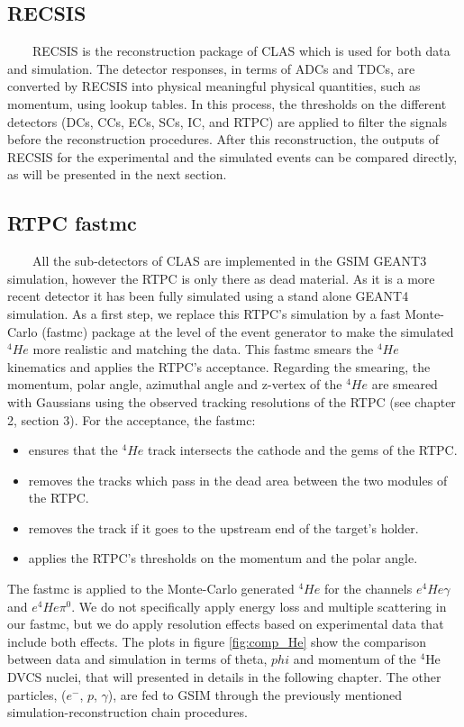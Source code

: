 \subsection{RECSIS}

~~~~RECSIS is the reconstruction package of CLAS which is used for both data 
and simulation. The detector responses, in terms of ADCs and TDCs, are 
converted by RECSIS into physical meaningful physical quantities, such as 
momentum, using lookup tables. In this process, the thresholds on the different 
detectors (DCs, CCs, ECs, SCs, IC, and RTPC) are applied to filter the signals 
before the reconstruction procedures. After this reconstruction, the outputs of 
RECSIS for the experimental and the simulated events can be compared directly, 
as will be presented in the next section.

\subsection{RTPC fastmc}
~~~~All the sub-detectors of CLAS are implemented in the GSIM GEANT3 simulation, 
however the RTPC is only there as dead material. As it is a more recent detector
it has been fully simulated using a stand alone GEANT4 simulation. As a 
first step, we replace this RTPC's simulation by a fast Monte-Carlo (fastmc) 
package at the level of the event generator to make the simulated $^{4}He$ more 
realistic and matching the data. This fastmc smears the $^{4}He$ kinematics and 
applies the RTPC's acceptance. Regarding the smearing, the momentum, polar 
angle, azimuthal angle and z-vertex of the $^{4}He$ are smeared with Gaussians 
using the observed tracking resolutions of the RTPC (see chapter 2, section 3).  
For the acceptance, the fastmc:
\begin{itemize}
\item ensures that the $^{4}He$ track intersects the cathode and the gems of the RTPC.
\item removes the tracks which pass in the dead area between the two modules of the RTPC.
\item removes the track if it goes to the upstream end of the target's holder.
\item applies the RTPC's thresholds on the momentum and the polar angle.
\end{itemize} 

The fastmc is applied to the Monte-Carlo generated $^{4}He$ for the channels 
$e^{4}He\gamma$ and $e^{4}He\pi^{0}$. We do not specifically apply energy loss 
and multiple scattering in our fastmc, but we do apply resolution effects based 
on experimental data that include both effects. The plots in figure 
\ref{fig:comp_He} show the comparison between data and simulation in terms of 
theta, $phi$ and momentum of the $^{4}$He DVCS nuclei, that will presented in 
details in the following chapter. The other particles, ($e^{-}$, $p$, 
$\gamma$), are fed to GSIM through the previously mentioned 
simulation-reconstruction chain procedures.

